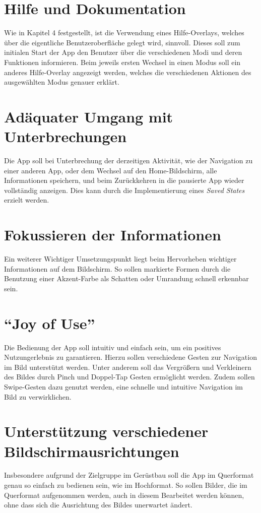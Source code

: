 \section{Hilfe und Dokumentation}
Wie in Kapitel 4 festgestellt, ist die Verwendung eines Hilfe-Overlays, welches über die eigentliche Benutzeroberfläche gelegt wird, sinnvoll. 
Dieses soll zum initialen Start der App den Benutzer über die verschiedenen Modi und deren Funktionen informieren.
Beim jeweils ersten Wechsel in einen Modus soll ein anderes Hilfe-Overlay angezeigt werden, welches die verschiedenen Aktionen des ausgewählten Modus genauer erklärt.

\section{Adäquater Umgang mit Unterbrechungen}
Die App soll bei Unterbrechung der derzeitigen Aktivität, wie der Navigation zu einer anderen App, oder dem Wechsel auf den Home-Bildschirm, alle Informationen speichern, und beim Zurückkehren in die pausierte App wieder vollständig anzeigen.
Dies kann durch die Implementierung eines \emph{Saved States} erzielt werden.

\section{Fokussieren der Informationen}
Ein weiterer Wichtiger Umsetzungspunkt liegt beim Hervorheben wichtiger Informationen auf dem Bildschirm.
So sollen markierte Formen durch die Benutzung einer Akzent-Farbe als Schatten oder Umrandung schnell erkennbar sein.

\section{``Joy of Use''}
Die Bedienung der App soll intuitiv und einfach sein, um ein positives Nutzungerlebnis zu garantieren.
Hierzu sollen verschiedene Gesten zur Navigation im Bild unterstützt werden.
Unter anderem soll das Vergrößern und Verkleinern des Bildes durch Pinch und Doppel-Tap Gesten ermöglicht werden.
Zudem sollen Swipe-Gesten dazu genutzt werden, eine schnelle und intuitive Navigation im Bild zu verwirklichen.

\section{Unterstützung verschiedener Bildschirmausrichtungen}
Insbesondere aufgrund der Zielgruppe im Gerüstbau soll die App im Querformat genau so einfach zu bedienen sein, wie im Hochformat.
So sollen Bilder, die im Querformat aufgenommen werden, auch in diesem Bearbeitet werden können, ohne dass sich die Ausrichtung des Bildes unerwartet ändert.


